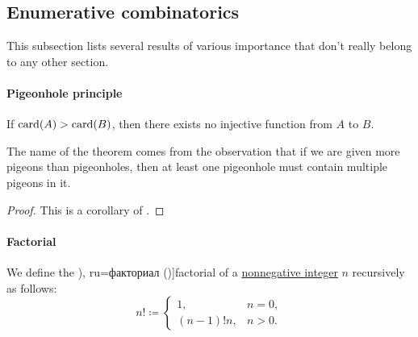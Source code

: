 \subsection{Enumerative combinatorics}\label{subsec:enumerative_combinatorics}

This subsection lists several results of various importance that don't really belong to any other section.

\paragraph{Pigeonhole principle}

\begin{theorem}\label{thm:pigeonhole_principle}
  If \( \operatorname{card}(A) > \operatorname{card}(B) \), then there exists no injective function from \( A \) to \( B \).
\end{theorem}
\begin{comments}
  \item The name of the theorem comes from the observation that if we are given more pigeons than pigeonholes, then at least one pigeonhole must contain multiple pigeons in it.
\end{comments}
\begin{proof}
  This is a corollary of .
\end{proof}

\paragraph{Factorial}

\begin{definition}\label{def:factorial}
  We define the \term[bg=факториел (\cite[129]{Тагамлицки1971Диф}), ru=факториал (\cite[145]{АлександровМаркушевичХинчинЭнциклопедия1952Том3})]{factorial} of a \hyperref[def:integer_signum]{nonnegative integer} \( n \) recursively as follows:
  \begin{equation*}
    n! \coloneqq \begin{cases}
      1,          &n = 0, \\
      (n - 1)! n, &n > 0.
    \end{cases}
  \end{equation*}
\end{definition}

